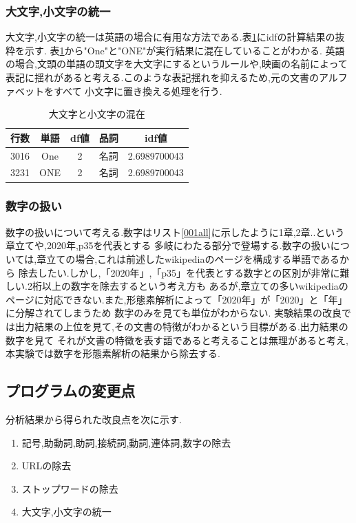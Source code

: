\documentclass[a4j]{jarticle}
\begin{document}
\subsubsection{大文字,小文字の統一}
大文字,小文字の統一は英語の場合に有用な方法である.表\ref{OneOne}にidfの計算結果の抜粋を示す.
表\ref{OneOne}から"One"と"ONE"が実行結果に混在していることがわかる.
英語の場合,文頭の単語の頭文字を大文字にするというルールや,映画の名前によって
表記に揺れがあると考える.このような表記揺れを抑えるため,元の文書のアルファベットをすべて
小文字に置き換える処理を行う.
\begin{table}[H]
	\caption{大文字と小文字の混在}
	\label{OneOne}
	\begin{center}
		\begin{tabular}{l|c c c c}\hline
			行数 & 単語 & df値 & 品詞 & idf値 \\ \hline
			\hline 
			3016 & One & 2 & 名詞 & 2.6989700043 \\ 
			3231 & ONE & 2 & 名詞 & 2.6989700043 \\ \hline
 		\end{tabular}
	\end{center}
	\end{table}

\subsubsection{数字の扱い}
数字の扱いについて考える.数字はリスト\ref{001all}に示したように1章,2章..という章立てや,2020年,p35を代表とする
多岐にわたる部分で登場する.数字の扱いについては,章立ての場合,これは前述したwikipediaのページを構成する単語であるから
除去したい.しかし,「2020年」,「p35」を代表とする数字との区別が非常に難しい.2桁以上の数字を除去するという考え方も
あるが,章立ての多いwikipediaのページに対応できない.また,形態素解析によって「2020年」が「2020」と「年」に分解されてしまうため
数字のみを見ても単位がわからない.
実験結果の改良では出力結果の上位を見て,その文書の特徴がわかるという目標がある.出力結果の数字を見て
それが文書の特徴を表す語であると考えることは無理があると考え,本実験では数字を形態素解析の結果から除去する.
\subsection{プログラムの変更点}
分析結果から得られた改良点を次に示す.
\begin{enumerate}
	\item 記号,助動詞,助詞,接続詞,動詞,連体詞,数字の除去
	\item URLの除去
	\item ストップワードの除去
	\item 大文字,小文字の統一
\end{enumerate}
\end{document}
